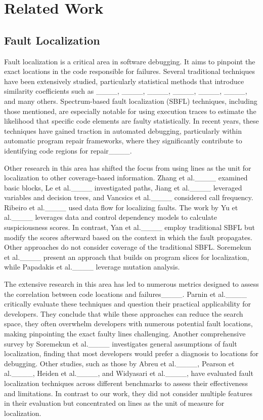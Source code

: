 \section{Related Work}
%
\label{sec:related-work}

\subsection{Fault Localization}%
\label{sub:related-fault-localization}

Fault localization is a critical area in software debugging.
It aims to pinpoint the exact locations in the code responsible for failures.
Several traditional techniques have been extensively studied, particularly statistical methods that introduce similarity coefficients such as \TARANTULA{}____, \OCHIAI{}____, \DSTAR{}____, \GP{}____, \AMPLE{}____, \JACCARD{}____, and many others.
Spectrum-based fault localization (SBFL) techniques, including those mentioned, are especially notable for using execution traces to estimate the likelihood that specific code elements are faulty statistically.
In recent years, these techniques have gained traction in automated debugging, particularly within automatic program repair frameworks, where they significantly contribute to identifying code regions for repair____.

Other research in this area has shifted the focus from using lines as the unit for localization to other coverage-based information.
Zhang et al.____ examined basic blocks, Le et al.____ investigated paths, Jiang et al.____ leveraged variables and decision trees, and Vancsics et al.____ considered call frequency.
Ribeiro et al.____ used data flow for localizing faults.
The work by Yu et al.____ leverages data and control dependency models to calculate suspiciousness scores.
In contrast, Yan et al.____ employ traditional SBFL but modify the scores afterward based on the context in which the fault propagates.
Other approaches do not consider coverage of the traditional SBFL.
Soremekun et al.____ present an approach that builds on program slices for localization, while Papadakis et al.____ leverage mutation analysis.

The extensive research in this area has led to numerous metrics designed to assess the correlation between code locations and failures____.
Parnin et al.____ critically evaluate these techniques and question their practical applicability for developers.
They conclude that while these approaches can reduce the search space, they often overwhelm developers with numerous potential fault locations, making pinpointing the exact faulty lines challenging.
Another comprehensive survey by Soremekun et al.____ investigates general assumptions of fault localization, finding that most developers would prefer a diagnosis to locations for debugging.
Other studies, such as those by Abreu et al.____, Pearson et al.____, Heiden et al.____, and Widyasari et al.____, have evaluated fault localization techniques across different benchmarks to assess their effectiveness and limitations.
In contrast to our work, they did not consider multiple features in their evaluation but concentrated on lines as the unit of measure for localization.

